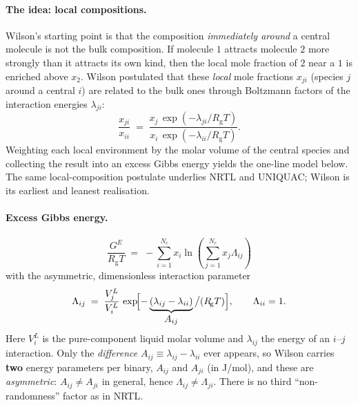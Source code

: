 \documentclass[11pt,a4paper]{article}
\newcommand{\Rgas}{R_{\!\mathrm{g}}}                %
\newcommand{\Gex}{G^{E}}
\begin{document}
\paragraph{The idea: local compositions.}
Wilson's \cite{Wilson} starting point is that the composition
\emph{immediately around} a central molecule is not the bulk
composition. If molecule $1$ attracts molecule $2$ more strongly than it
attracts its own kind, then the local mole fraction of $2$ near a $1$ is
enriched above $x_2$. Wilson postulated that these \emph{local} mole
fractions $x_{ji}$ (species $j$ around a central $i$) are related to the
bulk ones through Boltzmann factors of the interaction energies
$\lambda_{ji}$:
\begin{equation}
   \frac{x_{ji}}{x_{ii}}
   \;=\;
   \frac{x_j\,\exp\!\left(-\lambda_{ji}/\Rgas T\right)}
        {x_i\,\exp\!\left(-\lambda_{ii}/\Rgas T\right)} .
   \label{eq:wilson-local}
\end{equation}
Weighting each local environment by the molar volume of the central
species and collecting the result into an excess Gibbs energy yields the
one-line model below. The same local-composition postulate underlies
NRTL and UNIQUAC; Wilson is its earliest and leanest realisation.

\paragraph{Excess Gibbs energy.}
\begin{equation}
   \boxed{\;
   \frac{\Gex}{\Rgas T} \;=\;
   -\sum_{i=1}^{N_c} x_i \ln \!\left(\sum_{j=1}^{N_c} x_j \Lambda_{ij}\right)
   \;}
   \label{eq:wilson-GE}
\end{equation}
with the asymmetric, dimensionless interaction parameter
\begin{equation}
   \Lambda_{ij} \;=\; \frac{V_j^L}{V_i^L}\,
        \exp\!\Bigl[-\underbrace{(\lambda_{ij} - \lambda_{ii})}_{\textstyle A_{ij}}\big/(\Rgas T)\Bigr],
   \qquad \Lambda_{ii} = 1 .
   \label{eq:wilson-Lambda}
\end{equation}
Here $V_i^L$ is the pure-component liquid molar volume and
$\lambda_{ij}$ the energy of an $i$--$j$ interaction. Only the
\emph{difference} $A_{ij} \equiv \lambda_{ij}-\lambda_{ii}$ ever appears,
so Wilson carries \textbf{two} energy parameters per binary, $A_{ij}$ and
$A_{ji}$ (in J/mol), and these are \emph{asymmetric}:
$A_{ij}\ne A_{ji}$ in general, hence $\Lambda_{ij}\ne\Lambda_{ji}$. There
is no third ``non-randomness'' factor as in NRTL.
\end{document}
